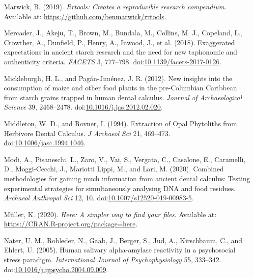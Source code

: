 \documentclass[utf8]{../templates/frontiersSCNS}
\newlength{\cslhangindent}
\newlength{\cslentryspacingunit} %
\newenvironment{CSLReferences}[2] %
 {%
  \setlength{\parindent}{0pt}
  \ifodd #1
  \let\oldpar\par
  \def\par{\hangindent=\cslhangindent\oldpar}
  \fi
  \setlength{\parskip}{#2\cslentryspacingunit}
 }%
 {}
\begin{document}
\begin{CSLReferences}{1}{0}
\leavevmode{}%
Marwick, B. (2019). \emph{Rrtools: {Creates} a reproducible research compendium}. Available at: \url{https://github.com/benmarwick/rrtools}.

\leavevmode{}%
Mercader, J., Akeju, T., Brown, M., Bundala, M., Collins, M. J., Copeland, L., Crowther, A., Dunfield, P., Henry, A., Inwood, J., et al. (2018). Exaggerated expectations in ancient starch research and the need for new taphonomic and authenticity criteria. \emph{FACETS} 3, 777--798. doi:\href{https://doi.org/10.1139/facets-2017-0126}{10.1139/facets-2017-0126}.

\leavevmode{}%
Mickleburgh, H. L., and Pagán-Jiménez, J. R. (2012). New insights into the consumption of maize and other food plants in the pre-{Columbian Caribbean} from starch grains trapped in human dental calculus. \emph{Journal of Archaeological Science} 39, 2468--2478. doi:\href{https://doi.org/10.1016/j.jas.2012.02.020}{10.1016/j.jas.2012.02.020}.

\leavevmode{}%
Middleton, W. D., and Rovner, I. (1994). Extraction of {Opal Phytoliths} from {Herbivore Dental Calculus}. \emph{J Archaeol Sci} 21, 469--473. doi:\href{https://doi.org/10.1006/jasc.1994.1046}{10.1006/jasc.1994.1046}.

\leavevmode{}%
Modi, A., Pisaneschi, L., Zaro, V., Vai, S., Vergata, C., Casalone, E., Caramelli, D., Moggi-Cecchi, J., Mariotti Lippi, M., and Lari, M. (2020). Combined methodologies for gaining much information from ancient dental calculus: Testing experimental strategies for simultaneously analysing {DNA} and food residues. \emph{Archaeol Anthropol Sci} 12, 10. doi:\href{https://doi.org/10.1007/s12520-019-00983-5}{10.1007/s12520-019-00983-5}.

\leavevmode{}%
Müller, K. (2020). \emph{Here: {A} simpler way to find your files}. Available at: \url{https://CRAN.R-project.org/package=here}.

\leavevmode{}%
Nater, U. M., Rohleder, N., Gaab, J., Berger, S., Jud, A., Kirschbaum, C., and Ehlert, U. (2005). Human salivary alpha-amylase reactivity in a psychosocial stress paradigm. \emph{International Journal of Psychophysiology} 55, 333--342. doi:\href{https://doi.org/10.1016/j.ijpsycho.2004.09.009}{10.1016/j.ijpsycho.2004.09.009}.


\end{CSLReferences}
\end{document}
